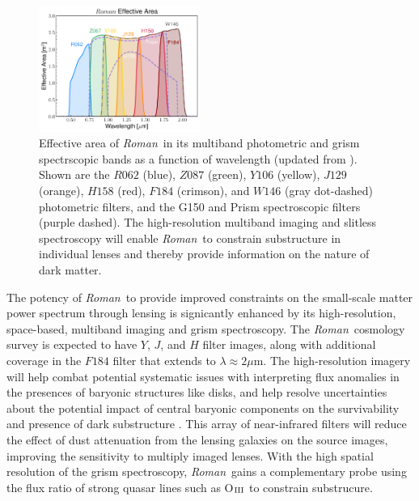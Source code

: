 \documentclass[11pt]{article}
\newcommand{\RST}{\emph{Roman}~}
\begin{document}
\begin{figure}
\begin{center}
\includegraphics[width=0.47\textwidth]{roman_effective_area_color.pdf}
\end{center}
\caption{Effective area of \RST in its multiband photometric and grism spectrscopic bands as a function of wavelength (updated from \citep[Akeson et al. 2019][]{akeson2019a}). Shown are the $R062$ (blue), $Z087$ (green), $Y106$ (yellow), $J129$ (orange), $H158$ (red), $F184$ (crimson), and $W146$ (gray dot-dashed) photometric filters, and the G150 and Prism spectroscopic filters (purple dashed). The high-resolution multiband imaging and slitless spectroscopy will enable \RST to constrain substructure in individual lenses and thereby provide information on the nature of dark matter.}
\label{fig:effective_area}
\end{figure}

The potency of \RST to provide improved constraints on the small-scale matter power spectrum
through lensing is signicantly enhanced by its high-resolution, space-based, multiband imaging
and grism spectroscopy. The \RST cosmology survey is expected to have $Y$, $J$, and $H$ filter
images, along with additional coverage in the $F184$ filter that extends to $\lambda\approx2\mu$m.
The high-resolution imagery will help combat potential systematic issues with interpreting
flux anomalies in the presences of baryonic structures like disks\citep{hsueh2017a}, and
help resolve uncertainties about the potential impact of central baryonic components on the
survivability and presence of dark substructure \citep{garrison-kimmel2017a,graus2018a}.
This array of near-infrared filters will reduce the effect of dust attenuation from the lensing
galaxies on the source images, improving the sensitivity to multiply imaged lenses. With the
high spatial resolution of the
grism spectroscopy, \RST gains a complementary probe using the flux ratio of strong quasar lines
such as O$_{\rm{III}}$ to constrain substrucure\citep{nierenberg2017a}.
\end{document}

